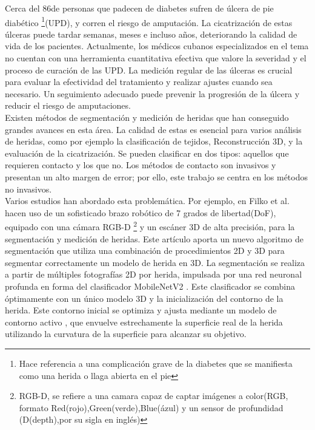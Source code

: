 \documentclass[12pt]{article}
\begin{document}
	Cerca del 86\textdiscount \space de personas que padecen de diabetes sufren de \'ulcera de pie diab\'etico \footnote{Hace referencia a una complicaci\'on grave de la diabetes que se manifiesta como una herida o llaga abierta en el pie}(UPD), y corren el riesgo de amputaci\'on. La cicatrizaci\'on de estas \'ulceras puede tardar semanas, meses e incluso a\~nos, deteriorando la calidad de vida de los pacientes. Actualmente, los médicos cubanos especializados en el tema no cuentan con una herramienta cuantitativa efectiva que valore la severidad y el proceso de curación de las UPD. La medición regular de las úlceras es crucial para evaluar la efectividad del tratamiento y realizar ajustes cuando sea necesario. Un seguimiento adecuado puede prevenir la progresión de la úlcera y reducir el riesgo de amputaciones.
	\\
	
	
	Existen m\'etodos de segmentaci\'on y medici\'on de heridas que han conseguido grandes avances en esta \'area. La calidad de estas es esencial para varios an\'alisis de heridas, como por ejemplo la clasificaci\'on de tejidos, Reconstrucci\'on 3D, y la evaluaci\'on de la cicatrizaci\'on\parencite{Filko2023}. Se pueden clasificar en dos tipos: aquellos que requieren contacto y los que no. Los métodos de contacto son invasivos y presentan un alto margen de error; por ello, este trabajo se centra en los métodos no invasivos.
	\\
	
	 

	
	Varios estudios han abordado esta problem\'atica. Por ejemplo, en Filko et al. \parencite{Filko2023} hacen uso de un sofisticado brazo rob\'otico de 7 grados de libertad(DoF), equipado con una c\'amara RGB-D \footnote{RGB-D, se refiere a una camara capaz de captar im\'agenes a color(RGB, formato Red(rojo),Green(verde),Blue(\'azul) y un sensor de profundidad (D(depth),por su sigla en ingl\'es)} y un esc\'aner 3D de alta precisi\'on, para la segmentaci\'on y medici\'on de heridas. Este artículo aporta un nuevo algoritmo de segmentación que utiliza una combinación de procedimientos 2D y 3D para segmentar correctamente un modelo de herida en 3D. La segmentación se realiza a partir de múltiples fotografías 2D por herida, impulsada por una red neuronal profunda en forma del clasificador MobileNetV2  \parencite{Filko2023}. Este clasificador se combina óptimamente con un único modelo 3D y la inicialización del contorno de la herida. Este contorno inicial se optimiza y ajusta mediante un modelo de contorno activo \parencite{Filko2023}, que envuelve estrechamente la superficie real de la herida utilizando la curvatura de la superficie para alcanzar su objetivo.
	\\
	
\end{document}
